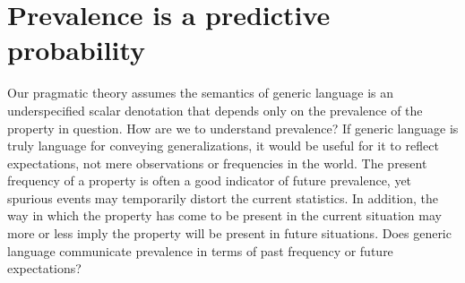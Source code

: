 \documentclass[12pt,letterpaper]{article}
\begin{document}



%

\section*{Prevalence is a predictive probability}

Our pragmatic theory assumes the semantics of generic language is an underspecified scalar denotation that depends only on the prevalence of the property in question.
How are we to understand prevalence?
If generic language is truly language for conveying generalizations, it would be useful for it to reflect expectations, not mere observations or frequencies in the world.
The present frequency of a property is often a good indicator of future prevalence, yet spurious events may temporarily distort the current statistics.
In addition, the way in which the property has come to be present in the current situation may more or less imply the property will be present in future situations.
Does generic language communicate prevalence in terms of past frequency or future expectations?
\end{document}
